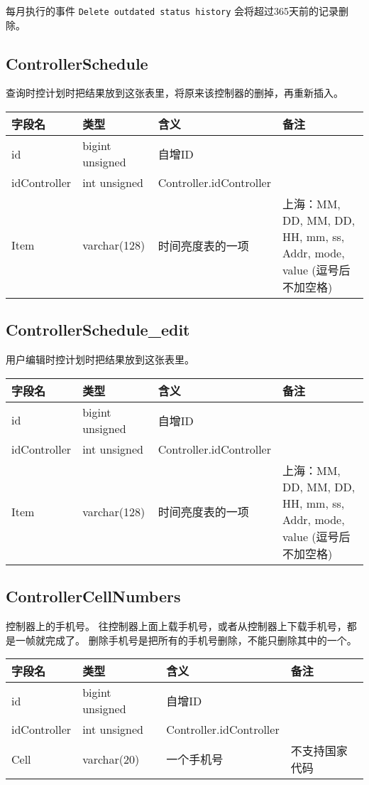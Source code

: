 每月执行的事件 \texttt{Delete outdated status history}
会将超过365天前的记录删除。

\subsection{ControllerSchedule}\label{controllerschedule}

查询时控计划时把结果放到这张表里，将原来该控制器的删掉，再重新插入。

\begin{longtabu}[c]{@{}lXXX@{}}
\toprule
字段名 & 类型 & 含义 & 备注\tabularnewline
\midrule
\endhead
id & bigint unsigned & 自增ID &\tabularnewline
idController & int unsigned & Controller.idController &\tabularnewline
Item & varchar(128) & 时间亮度表的一项 & 上海：MM, DD, MM, DD, HH, mm,
ss, Addr, mode, value (逗号后不加空格)\tabularnewline
\bottomrule
\end{longtabu}

\subsection{ControllerSchedule\_edit}\label{controllerscheduleux5fedit}

用户编辑时控计划时把结果放到这张表里。

\begin{longtabu}[c]{@{}lXXX@{}}
\toprule
字段名 & 类型 & 含义 & 备注\tabularnewline
\midrule
\endhead
id & bigint unsigned & 自增ID &\tabularnewline
idController & int unsigned & Controller.idController &\tabularnewline
Item & varchar(128) & 时间亮度表的一项 & 上海：MM, DD, MM, DD, HH, mm,
ss, Addr, mode, value (逗号后不加空格)\tabularnewline
\bottomrule
\end{longtabu}

\subsection{ControllerCellNumbers}\label{controllercellnumbers}

控制器上的手机号。
往控制器上面上载手机号，或者从控制器上下载手机号，都是一帧就完成了。
删除手机号是把所有的手机号删除，不能只删除其中的一个。

\begin{longtabu}[c]{@{}lXXX@{}}
\toprule
字段名 & 类型 & 含义 & 备注\tabularnewline
\midrule
\endhead
id & bigint unsigned & 自增ID &\tabularnewline
idController & int unsigned & Controller.idController &\tabularnewline
Cell & varchar(20) & 一个手机号 & 不支持国家代码\tabularnewline
\bottomrule
\end{longtabu}

